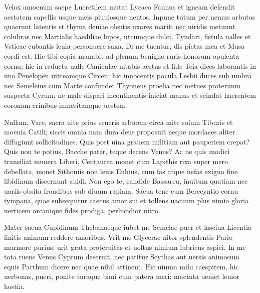 \documentclass{book}
\newenvironment {carmen} [1] [\relax] 
  {\Titulus \Versus \incipit*\numerus{1}#1}
  {\endVersus}
\newcommand {\Alcaic}    {\Forma \strophae {0 \poena 01 \poena 2}}
\newcommand {\GlycAscl}  {\Forma \strophae {2 \poena 0}}
\begin{document}
\begin{carmen}[\Alcaic]


 Velox amoenum saepe Lucretilem
 mutat Lycaeo Faunus et igneam
      defendit aestatem capellis
      usque meis pluuiosque uentos.
 Inpune tutum per nemus arbutos               
 quaerunt latentis et thyma deuiae
      olentis uxores mariti
      nec uiridis metuunt colubras
 nec Martialis haediliae lupos,
 utcumque dulci, Tyndari, fistula               
      ualles et Vsticae cubantis
      leuia personuere saxa.
 Di me tuentur, dis pietas mea
 et Musa cordi est. Hic tibi copia
       manabit ad plenum benigno
      ruris honorum opulenta cornu;               
 hic in reducta ualle Caniculae
 uitabis aestus et fide Teia
      dices laborantis in uno
       Penelopen uitreamque Circen;               
 hic innocentis pocula Lesbii
 duces sub umbra nec Semeleius
      cum Marte confundet Thyoneus
      proelia nec metues proteruum
 suspecta Cyrum, ne male dispari               
 incontinentis iniciat manus
      et scindat haerentem coronam
      crinibus inmeritamque uestem. 
\end{carmen}
\begin{carmen}

 Nullam, Vare, sacra uite prius seueris arborem
 circa mite solum Tiburis et moenia Catili;
 siccis omnia nam dura deus proposuit neque
 mordaces aliter diffugiunt sollicitudines. 
 Quis post uina grauem militiam aut pauperiem crepat?               
 Quis non te potius, Bacche pater, teque decens Venus?
 Ac ne quis modici transiliat munera Liberi,
 Centaurea monet cum Lapithis rixa super mero
 debellata, monet Sithoniis non leuis Euhius,
 cum fas atque nefas exiguo fine libidinum               
 discernunt auidi. Non ego te, candide Bassareu,
 inuitum quatiam nec uariis obsita frondibus
 sub diuum rapiam. Saeua tene cum Berecyntio
 cornu tympana, quae subsequitur caecus amor sui
 et tollens uacuum plus nimio gloria uerticem               
 arcanique fides prodiga, perlucidior uitro. 

\end{carmen}

\begin{carmen}[\GlycAscl]


      Mater saeua Cupidinum
 Thebanaeque iubet me Semelae puer
      et lasciua Licentia
 finitis animum reddere amoribus.
       Vrit me Glycerae nitor               
 splendentis Pario marmore purius;
      urit grata proteruitas
 et uoltus nimium lubricus aspici.
      In me tota ruens Venus
 Cyprum deseruit, nec patitur Scythas               
      aut uersis animosum equis
 Parthum dicere nec quae nihil attinent.
      Hic uiuum mihi caespitem, hic
 uerbenas, pueri, ponite turaque
       bimi cum patera meri:
 mactata ueniet lenior hostia.                

\end{carmen}
\end{document}
